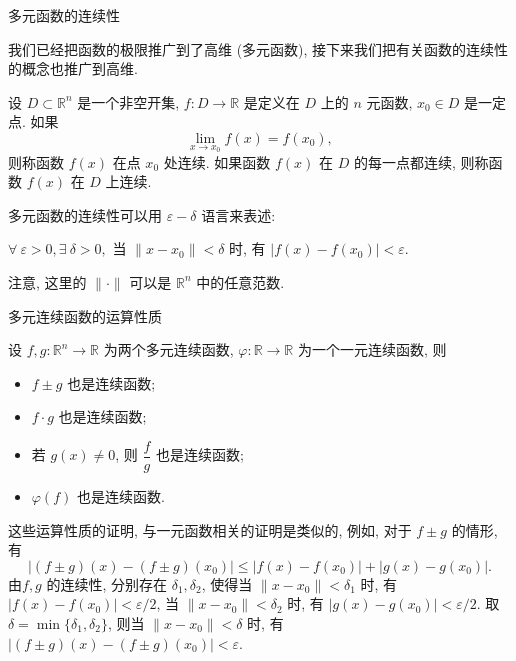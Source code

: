 \begin{frame}{多元函数的连续性}

我们已经把函数的极限推广到了高维 (多元函数), 接下来我们把有关函数的连续性的概念也推广到高维.

\pause

\begin{Def}[多元函数的连续性]
设 $D \subset \mathbb{R}^n$ 是一个非空开集, $f: D \to \mathbb{R}$ 是定义在 $D$ 上的 $n$ 元函数, $x_0 \in D$ 是一定点. 如果
\[\lim_{x \to x_0} f(x) = f(x_0),\]
则称函数 $f(x)$ 在点 $x_0$ 处连续.
\pause
如果函数 $f(x)$ 在 $D$ 的每一点都连续, 则称函数 $f(x)$ 在 $D$ 上连续.
\end{Def}

\pause

\begin{remark}
多元函数的连续性可以用 $\varepsilon - \delta$ 语言来表述:

\pause

\begin{center}
$\forall~\varepsilon > 0, \exists~\delta > 0,$ 当 $\lVert x - x_0 \rVert < \delta$ 时, 有 $\lvert f(x) - f(x_0) \rvert < \varepsilon.$
\end{center}

\pause

注意, 这里的 $\lVert \cdot \rVert$ 可以是 $\mathbb{R}^n$ 中的任意范数.
\end{remark}

\end{frame}


\begin{frame}{多元连续函数的运算性质}

设 $f, g: \mathbb{R}^n \to \mathbb{R}$ 为两个多元连续函数, $\varphi: \mathbb{R} \to \mathbb{R}$ 为一个一元连续函数, 则
\begin{itemize}
\item $f \pm g$ 也是连续函数;
\item $f \cdot g$ 也是连续函数;
\item 若 $g(x) \neq 0$, 则 $\dfrac{f}{g}$ 也是连续函数;
\item $\varphi(f)$ 也是连续函数.
\end{itemize}

\pause

这些运算性质的证明, 与一元函数相关的证明是类似的, 例如, 对于 $f \pm g$ 的情形, 有
\[\lvert (f \pm g)(x) - (f \pm g)(x_0) \rvert \leqslant \lvert f(x) - f(x_0) \rvert + \lvert g(x) - g(x_0) \rvert.\]
由$f, g$ 的连续性, 分别存在 $\delta_1, \delta_2$, 使得当 $\lVert x - x_0 \rVert < \delta_1$ 时, 有 $\lvert f(x) - f(x_0) \rvert < \varepsilon / 2$, 当 $\lVert x - x_0 \rVert < \delta_2$ 时, 有 $\lvert g(x) - g(x_0) \rvert < \varepsilon / 2$. 取 $\delta = \min\{\delta_1, \delta_2\}$, 则当 $\lVert x - x_0 \rVert < \delta$ 时, 有 $\lvert (f \pm g)(x) - (f \pm g)(x_0) \rvert < \varepsilon.$

\end{frame}

